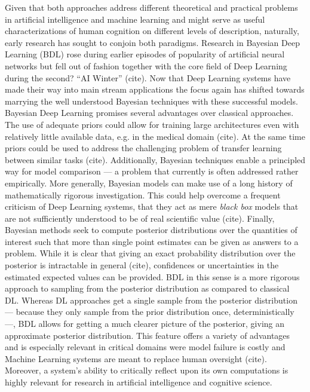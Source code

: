 \documentclass[10pt,a4paper,twocolumn]{article}
\begin{document}
Given that both approaches address different theoretical and practical problems in artificial intelligence and machine learning and might serve as useful characterizations of human cognition on different levels of description, naturally, early research has sought to conjoin both paradigms. Research in Bayesian Deep Learning (BDL) rose during earlier episodes of popularity of artificial neural networks but fell out of fashion together with the core field of Deep Learning during the second? ``AI Winter'' (cite). Now that Deep Learning systems have made their way into main stream applications the focus again has shifted towards marrying the well understood Bayesian techniques with these successful models. Bayesian Deep Learning promises several advantages over classical approaches. The use of adequate priors could allow for training large architectures even with relatively little available data, e.g. in the medical domain (cite). At the same time priors could be used to address the challenging problem of transfer learning between similar tasks (cite). Additionally, Bayesian techniques enable a principled way for model comparison --- a problem that currently is often addressed rather empirically. More generally, Bayesian models can make use of a long history of mathematically rigorous investigation. This could help overcome a frequent criticism of Deep Learning systems, that they act as mere \emph{black box} models that are not sufficiently understood to be of real scientific value (cite).
Finally, Bayesian methods seek to compute posterior distributions over the quantities of interest such that more than single point estimates can be given as answers to a problem. While it is clear that giving an exact probability distribution over the posterior is intractable in general (cite), 
confidences or uncertainties in the estimated expected values can be provided.
BDL in this sense is a more rigorous approach to sampling from the posterior distribution as compared to classical DL. Whereas DL approaches get a single sample from the posterior distribution --- because they only sample from the prior distribution once, deterministically ---, BDL allows for getting a much clearer picture of the posterior, giving an approximate posterior distribution.
This feature offers a variety of advantages and is especially relevant in critical domains were model failure is costly and Machine Learning systems are meant to replace human oversight (cite). Moreover, a system's ability to critically reflect upon its own computations is highly relevant for research in artificial intelligence and cognitive science. 
\end{document}
